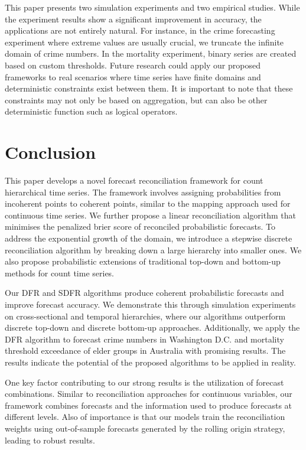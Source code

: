 \documentclass[a4paper,review,12pt,authoryear]{elsarticle}
\begin{document}
     This paper presents two simulation experiments and two empirical studies.
     While the experiment results show a significant improvement in accuracy, the applications are not entirely natural. 
     For instance, in the crime forecasting experiment where extreme values are usually crucial, we truncate the infinite domain of crime numbers. 
     In the mortality experiment, binary series are created based on custom thresholds.
     Future research could apply our proposed frameworks to real scenarios where time series have finite domains and deterministic constraints exist between them.  
     It is important to note that  these constraints may not only be based on aggregation, but can also be other deterministic function such as logical operators.


     

     \section{Conclusion}
     \label{sec:conclusion}
     
     This paper develops a novel forecast reconciliation framework for count hierarchical time series. 
     The framework involves assigning probabilities from incoherent points to coherent points, similar to the mapping approach used for continuous time series.
     We further propose a linear reconciliation algorithm that minimises the penalized brier score of reconciled probabilistic forecasts.
     To address the exponential growth of the domain, we introduce a stepwise discrete reconciliation algorithm by breaking down a large hierarchy into smaller ones.
     We also propose probabilistic extensions of traditional top-down and bottom-up methods for count time series.
     
     Our DFR and SDFR algorithms produce coherent probabilistic forecasts and improve forecast accuracy. 
     We demonstrate this through simulation experiments on cross-sectional and temporal hierarchies, where our algorithms outperform discrete top-down and discrete bottom-up approaches. Additionally, we apply the DFR algorithm to forecast crime numbers in Washington D.C. and mortality threshold exceedance of elder groups in Australia with promising results.
     The results indicate the potential of the proposed algorithms to be applied in reality.
     
     One key factor contributing to our strong results is  the utilization of forecast combinations.
     Similar to reconciliation approaches for continuous variables, our framework combines forecasts and the information used to produce forecasts at different levels.
     Also of importance is that our models train the reconciliation weights using out-of-sample forecasts generated by the rolling origin strategy, leading to robust results. 
     
\end{document}
